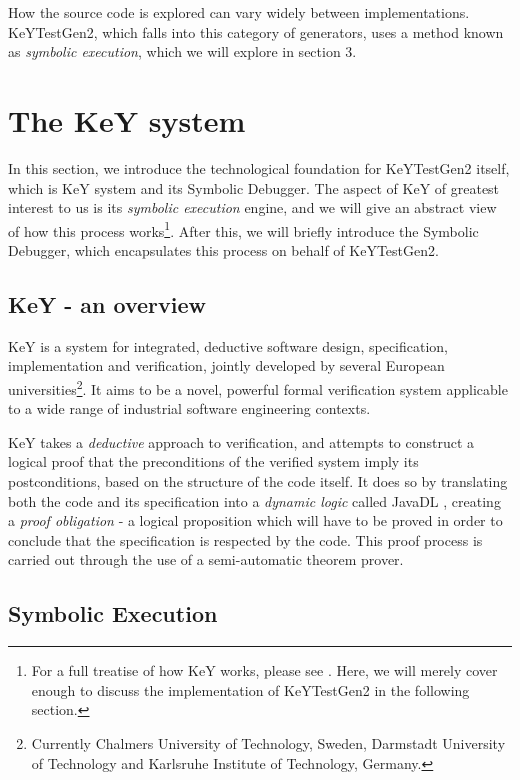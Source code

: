 \documentclass{article}
\newcommand{\tmem}[1]{{\em #1\/}}
\begin{document}
How the source code is explored can vary widely between implementations.
KeYTestGen2, which falls into this category of generators, uses a method known
as {\tmem{symbolic execution}}, which we will explore in section 3.

\section{The KeY system}

In this section, we introduce the technological foundation for KeYTestGen2
itself, which is KeY system and its Symbolic Debugger. The aspect of KeY of
greatest interest to us is its {\tmem{symbolic execution}} engine, and we will
give an abstract view of how this process works{\footnote{For a full treatise
of how KeY works, please see {\cite{KeYBook2007}}. Here, we will merely cover
enough to discuss the implementation of KeYTestGen2 in the following
section.}}. After this, we will briefly introduce the Symbolic Debugger, which
encapsulates this process on behalf of KeYTestGen2.

\subsection{KeY - an overview}

KeY
{\cite{KeY2005}}{\cite{KeYBook2007}}{\cite{AhrendtEtAl2007}}{\cite{KeYwebsite}}
is a system for integrated, deductive software design, specification,
implementation and verification, jointly developed by several European
universities{\footnote{Currently Chalmers University of Technology, Sweden,
Darmstadt University of Technology and Karlsruhe Institute of Technology,
Germany.}}. It aims to be a novel, powerful formal verification system
applicable to a wide range of industrial software engineering contexts.



KeY takes a {\tmem{deductive}} approach to verification, and attempts to
construct a logical proof that the preconditions of the verified system imply
its postconditions, based on the structure of the code itself. It does so by
translating both the code and its specification into a {\tmem{dynamic logic}}
called JavaDL {\cite{BeckertKlebanov2007}}, creating a {\tmem{proof
obligation}} - a logical proposition which will have to be proved in order to
conclude that the specification is respected by the code. This proof process
is carried out through the use of a semi-automatic theorem prover.

\subsection{Symbolic Execution}
\end{document}
